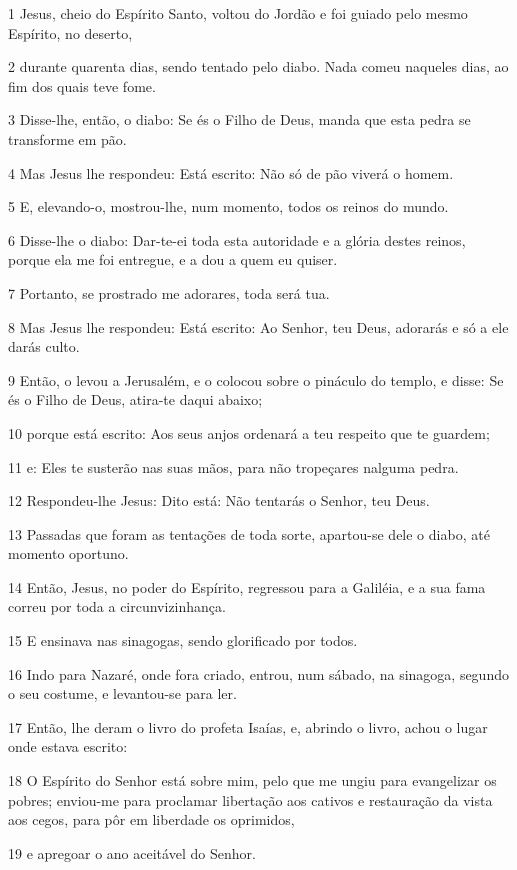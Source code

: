 \par 1 Jesus, cheio do Espírito Santo, voltou do Jordão e foi guiado pelo mesmo Espírito, no deserto,
\par 2 durante quarenta dias, sendo tentado pelo diabo. Nada comeu naqueles dias, ao fim dos quais teve fome.
\par 3 Disse-lhe, então, o diabo: Se és o Filho de Deus, manda que esta pedra se transforme em pão.
\par 4 Mas Jesus lhe respondeu: Está escrito: Não só de pão viverá o homem.
\par 5 E, elevando-o, mostrou-lhe, num momento, todos os reinos do mundo.
\par 6 Disse-lhe o diabo: Dar-te-ei toda esta autoridade e a glória destes reinos, porque ela me foi entregue, e a dou a quem eu quiser.
\par 7 Portanto, se prostrado me adorares, toda será tua.
\par 8 Mas Jesus lhe respondeu: Está escrito: Ao Senhor, teu Deus, adorarás e só a ele darás culto.
\par 9 Então, o levou a Jerusalém, e o colocou sobre o pináculo do templo, e disse: Se és o Filho de Deus, atira-te daqui abaixo;
\par 10 porque está escrito: Aos seus anjos ordenará a teu respeito que te guardem;
\par 11 e: Eles te susterão nas suas mãos, para não tropeçares nalguma pedra.
\par 12 Respondeu-lhe Jesus: Dito está: Não tentarás o Senhor, teu Deus.
\par 13 Passadas que foram as tentações de toda sorte, apartou-se dele o diabo, até momento oportuno.
\par 14 Então, Jesus, no poder do Espírito, regressou para a Galiléia, e a sua fama correu por toda a circunvizinhança.
\par 15 E ensinava nas sinagogas, sendo glorificado por todos.
\par 16 Indo para Nazaré, onde fora criado, entrou, num sábado, na sinagoga, segundo o seu costume, e levantou-se para ler.
\par 17 Então, lhe deram o livro do profeta Isaías, e, abrindo o livro, achou o lugar onde estava escrito:
\par 18 O Espírito do Senhor está sobre mim, pelo que me ungiu para evangelizar os pobres; enviou-me para proclamar libertação aos cativos e restauração da vista aos cegos, para pôr em liberdade os oprimidos,
\par 19 e apregoar o ano aceitável do Senhor.
